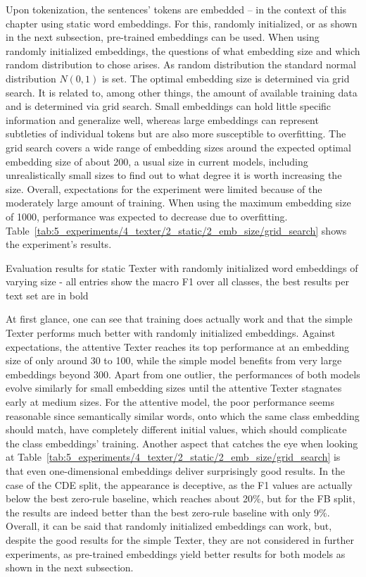 Upon tokenization, the sentences' tokens are embedded -- in the context of this chapter using static word embeddings. For this, randomly initialized, or as shown in the next subsection, pre-trained embeddings can be used. When using randomly initialized embeddings, the questions of what embedding size and which random distribution to chose arises. As random distribution the standard normal distribution $N(0, 1)$ is set. The optimal embedding size is determined via grid search. It is related to, among other things, the amount of available training data and is determined via grid search. Small embeddings can hold little specific information and generalize well, whereas large embeddings can represent subtleties of individual tokens but are also more susceptible to overfitting. The grid search covers a wide range of embedding sizes around the expected optimal embedding size of about 200, a usual size in current models, including unrealistically small sizes to find out to what degree it is worth increasing the size. Overall, expectations for the experiment were limited because of the moderately large amount of training. When using the maximum embedding size of 1000, performance was expected to decrease due to overfitting. Table~\ref{tab:5_experiments/4_texter/2_static/2_emb_size/grid_search} shows the experiment's results.

\begin{table}[t]
    \centering
    
    \caption{Evaluation results for static Texter with randomly initialized word embeddings of varying size - all entries show the macro F1 over all classes, the best results per text set are in bold}
    \label{tab:5_experiments/4_texter/2_static/2_emb_size/grid_search}
\end{table}

At first glance, one can see that training does actually work and that the simple Texter performs much better with randomly initialized embeddings. Against expectations, the attentive Texter reaches its top performance at an embedding size of only around 30 to 100, while the simple model benefits from very large embeddings beyond 300. Apart from one outlier, the performances of both models evolve similarly for small embedding sizes until the attentive Texter stagnates early at medium sizes. For the attentive model, the poor performance seems reasonable since semantically similar words, onto which the same class embedding should match, have completely different initial values, which should complicate the class embeddings' training. Another aspect that catches the eye when looking at Table~\ref{tab:5_experiments/4_texter/2_static/2_emb_size/grid_search} is that even one-dimensional embeddings deliver surprisingly good results. In the case of the CDE split, the appearance is deceptive, as the F1 values are actually below the best zero-rule baseline, which reaches about 20\%, but for the FB split, the results are indeed better than the best zero-rule baseline with only 9\%. Overall, it can be said that randomly initialized embeddings can work, but, despite the good results for the simple Texter, they are not considered in further experiments, as pre-trained embeddings yield better results for both models as shown in the next subsection.
